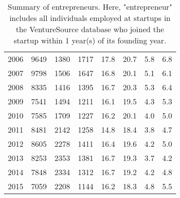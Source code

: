 \begin{table}[ht]
\begin{tabular}{p{1.75cm}p{1.75cm}p{1.75cm}p{1.75cm}p{1.75cm}p{1.75cm}p{1.75cm}p{1.75cm}}
  2006 & 9649 & 1380 & 1717 & 17.8 & 20.7 & 5.8 & 6.8 \\ 
  2007 & 9798 & 1506 & 1647 & 16.8 & 20.1 & 5.1 & 6.1 \\ 
  2008 & 8335 & 1416 & 1395 & 16.7 & 20.3 & 5.3 & 6.4 \\ 
  2009 & 7541 & 1494 & 1211 & 16.1 & 19.5 & 4.3 & 5.3 \\ 
  2010 & 7585 & 1709 & 1227 & 16.2 & 20.1 & 4.0 & 5.0 \\ 
  2011 & 8481 & 2142 & 1258 & 14.8 & 18.4 & 3.8 & 4.7 \\ 
  2012 & 8605 & 2278 & 1411 & 16.4 & 19.6 & 4.2 & 5.0 \\ 
  2013 & 8253 & 2353 & 1381 & 16.7 & 19.3 & 3.7 & 4.2 \\ 
  2014 & 7848 & 2334 & 1312 & 16.7 & 19.2 & 4.2 & 4.8 \\ 
  2015 & 7059 & 2208 & 1144 & 16.2 & 18.3 & 4.8 & 5.5 \\ 
   \bottomrule
\end{tabular}
\endgroup
\caption{Summary of entrepreneurs. Here, "entrepreneur" includes all individuals employed at startups in the VentureSource database who joined the startup within 1 year(s) of its founding year.} 
\end{table}
